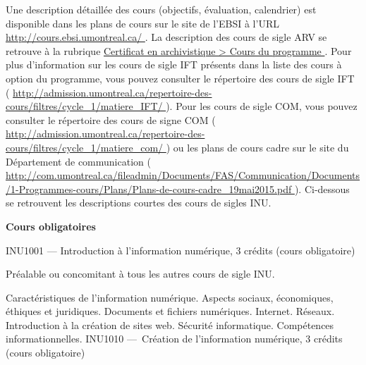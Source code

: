 \documentclass [12 pt]{article}
\begin{document}
            Une description détaillée des cours (objectifs, évaluation, calendrier) est
                disponible dans les plans de cours sur le site de l'EBSI à l'URL 
        \href{
        http://cours.ebsi.umontreal.ca/
        } {
        http://cours.ebsi.umontreal.ca/
        }
    . La description des cours de sigle ARV se
                retrouve à la rubrique 
        \href{
        /pages/viewpage.action?pageId=124097591
        } {
        Certificat
                    en archivistique > Cours du programme
        }
    . Pour plus d'information sur les
                cours de sigle IFT présents dans la liste des cours à option du programme, vous
                pouvez consulter le répertoire des cours de sigle IFT (
        \href{
        https://admission.umontreal.ca/repertoire-des-cours/filtres/cycle_1/matiere_IFT/
        } {
        http://admission.umontreal.ca/repertoire-des-cours/filtres/cycle_1/matiere_IFT/
        }
    ).
                Pour les cours de sigle COM, vous pouvez consulter le répertoire des cours de signe
                COM (
        \href{
        http://admission.umontreal.ca/repertoire-des-cours/filtres/cycle_1/matiere_com/
        } {
        http://admission.umontreal.ca/repertoire-des-cours/filtres/cycle_1/matiere_com/
        }
    )
                ou les plans de cours cadre sur le site du Département de communication (
        \href{
        http://com.umontreal.ca/fileadmin/Documents/FAS/Communication/Documents/1-Programmes-cours/Plans/Plans-de-cours-cadre_19mai2015.pdf
        } {
        http://com.umontreal.ca/fileadmin/Documents/FAS/Communication/Documents/1-Programmes-cours/Plans/Plans-de-cours-cadre_19mai2015.pdf
        }
    ).
                Ci-dessous se retrouvent les descriptions courtes des cours de sigles INU.
            
        \textbf{
        Cours obligatoires
        }
    
            INU1001 — Introduction à l'information numérique, 3 crédits (cours
                obligatoire)
            
                Préalable ou concomitant à tous les autres cours de sigle INU.
            
            Caractéristiques de l'information numérique. Aspects sociaux, économiques, éthiques
                et juridiques. Documents et fichiers numériques. Internet. Réseaux. Introduction à
                la création de sites web. Sécurité informatique. Compétences informationnelles.
            INU1010 — Création de l'information numérique, 3 crédits (cours
                obligatoire)
            
\end{document}
